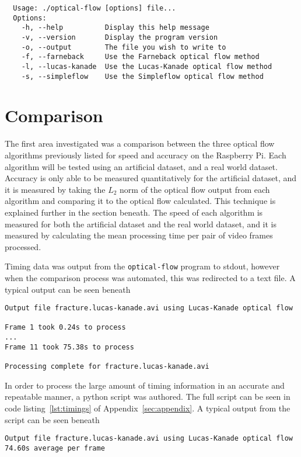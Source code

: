 \singlespacing
\begin{verbatim}
  Usage: ./optical-flow [options] file...
  Options:
    -h, --help          Display this help message
    -v, --version       Display the program version
    -o, --output        The file you wish to write to
    -f, --farneback     Use the Farneback optical flow method
    -l, --lucas-kanade  Use the Lucas-Kanade optical flow method
    -s, --simpleflow    Use the Simpleflow optical flow method
\end{verbatim}
\onehalfspacing

\section{Comparison}

The first area investigated was a comparison between the three optical flow algorithms previously listed for speed and accuracy on the Raspberry Pi. Each algorithm will be tested using an artificial dataset, and a real world dataset. Accuracy is only able to be measured quantitatively for the artificial dataset, and it is measured by taking the $L_2$ norm of the optical flow output from each algorithm and comparing it to the optical flow calculated. This technique is explained further in the section beneath. The speed of each algorithm is measured for both the artificial dataset and the real world dataset, and it is measured by calculating the mean processing time per pair of video frames processed. 

Timing data was output from the \verb|optical-flow| program to stdout, however when the comparison process was automated, this was redirected to a text file. A typical output can be seen beneath

\singlespacing
\begin{verbatim}
Output file fracture.lucas-kanade.avi using Lucas-Kanade optical flow

Frame 1 took 0.24s to process
...
Frame 11 took 75.38s to process

Processing complete for fracture.lucas-kanade.avi
\end{verbatim}
\onehalfspacing

In order to process the large amount of timing information in an accurate and repeatable manner, a python script was authored. The full script can be seen in code listing~\ref{lst:timings} of Appendix~\ref{sec:appendix}. A typical output from the script can be seen beneath

\singlespacing
\begin{verbatim}
Output file fracture.lucas-kanade.avi using Lucas-Kanade optical flow
74.60s average per frame
\end{verbatim}
\onehalfspacing

